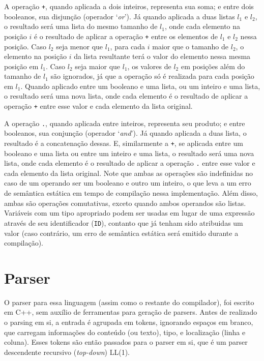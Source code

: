 \documentclass{article}
\begin{document}
A operação \texttt{+}, quando aplicada a dois inteiros, representa sua soma; e entre dois booleanos, sua disjunção (operador `\textit{or}'). Já quando aplicada a duas listas $l_1$ e $l_2$, o resultado será uma lista do mesmo tamanho de $l_1$, onde cada elemento na posição $i$ é o resultado de aplicar a operação \texttt{+} entre os elementos de $l_1$ e $l_2$ nessa posição. Caso $l_2$ seja menor que $l_1$, para cada $i$ maior que o tamanho de $l_2$, o elemento na posição $i$ da lista resultante terá o valor do elemento nessa mesma posição em $l_1$. Caso $l_2$ seja maior que $l_1$, os valores de $l_2$ em posições além do tamanho de $l_1$ são ignorados, já que a operação só é realizada para cada posição em $l_1$. Quando aplicado entre um booleano e uma lista, ou um inteiro e uma lista, o resultado será uma nova lista, onde cada elemento é o resultado de aplicar a operação \texttt{+} entre esse valor e cada elemento da lista original.

A operação \texttt{.}, quando aplicada entre inteiros, representa seu produto; e entre booleanos, sua conjunção (operador `\textit{and}'). Já quando aplicada a duas lista, o resultado é a concatenação dessas. E, similarmente a \texttt{+}, se aplicada entre um booleano e uma lista ou entre um inteiro e uma lista, o resultado será uma nova lista, onde cada elemento é o resultado de aplicar a operação \texttt{.} entre esse valor e cada elemento da lista original. Note que ambas as operações são indefinidas no caso de um operando ser um booleano e outro um inteiro, o que leva a um erro de semântica estática em tempo de compilação nessa implementação. Além disso, ambas são operações comutativas, exceto quando ambos operandos são listas. Variáveis com um tipo apropriado podem ser usadas em lugar de uma expressão através de seu identificador (\texttt{ID}), contanto que já tenham sido atribuidas um valor (caso contrário, um erro de semântica estática será emitido durante a compilação). 


\section{Parser}
\label{sec:parser}
O parser para essa linguagem (assim como o restante do compilador), foi escrito em C++, sem auxílio de ferramentas para geração de parsers. Antes de realizado o parsing em si, a entrada é agrupada em tokens, ignorando espaços em branco, que carregam informações do conteúdo (ou texto), tipo, e localização (linha e coluna). Esses tokens são então passados para o parser em si, que é um parser descendente recursivo (\textit{top-down}) LL(1). 
\end{document}
